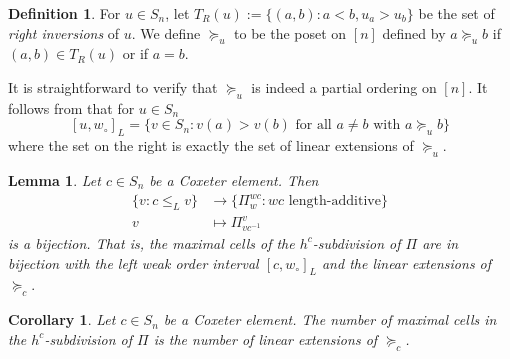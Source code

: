 \documentclass[11pt]{amsart}
\newtheorem{lemma}[Thm]{Lemma}
\newtheorem{corollary}[Thm]{Corollary}
\newtheorem{proposition}[Thm]{Proposition}
\theoremstyle{definition}
\newtheorem{definition}[Thm]{Definition}
\def\wo{w_\circ}
\def\hgt{h}
\def\hc{\hgt^c}
\def\rib_#1{\mathrm{rib}_{#1}}
\begin{document}
\begin{definition}
	For $u \in S_n$, let $T_R(u):= \{(a,b): a<b, u_a > u_b\}$ be the set of \emph{right inversions} of $u$. We define $\succcurlyeq_u$ to be the poset on $[n]$ defined by $a \succcurlyeq_u b$ if $(a,b) \in T_R(u)$ or if $a=b$.
\end{definition}

It is straightforward to verify that $\succcurlyeq_u$ is indeed a partial ordering on $[n]$. It follows from \cite[Proposition 3.1.3]{BB05} that for $u \in S_n$
\[[u, \wo]_L= \{v \in S_n: v(a)>v(b) \text{ for all }a \neq b \text{ with }a \succcurlyeq_u b \}\]
where the set on the right is exactly the set of linear extensions of $\succcurlyeq_u$.

\begin{lemma} \label{lem:cells-bijection-weak-order-interval} Let $c \in S_n$ be a Coxeter element.
	Then 
	\begin{align*}
		\{v: c \le_L v\} &\to \{\Pi_w^{wc}: wc \text{ length-additive}\}\\
		v &\mapsto \Pi_{vc^{-1}}^v
	\end{align*}
	is a bijection. That is, the maximal cells of the $\hc$-subdivision of $\Pi$ are in bijection with the left weak order interval $[c, \wo]_{L}$ and the linear extensions of $\succcurlyeq_c.$
\end{lemma}


\begin{corollary}
	Let $c \in S_n$ be a Coxeter element. The number of maximal cells in the $\hc$-subdivision of $\Pi$ is the number of linear extensions of $\succcurlyeq_c$.
\end{corollary}


\end{document}
